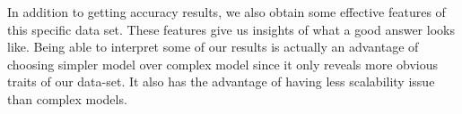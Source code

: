 \documentclass[11pt]{article}
\begin{document}
In addition to getting accuracy results, we also obtain some effective features of this specific data set. These features give us insights of what a good answer looks like. Being able to interpret some of our results is actually an advantage of choosing simpler model over complex model since it only reveals more obvious traits of our data-set. It also has the advantage of having less scalability issue than complex models.



\end{document}
